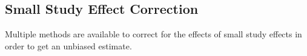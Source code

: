 \documentclass[11pt,a4paper,twoside]{book}\usepackage[]{graphicx}\usepackage[]{color}
\begin{document}
\subsection{Small Study Effect Correction}

Multiple methods are available to correct for the effects of small study effects in order to get an unbiased estimate. 


















\end{document}
